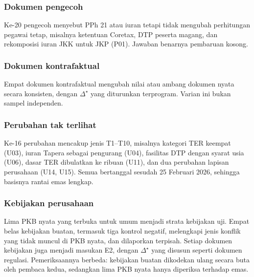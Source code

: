 \documentclass[journal,a4paper]{IEEEtran}
\newcommand{\emas}{\star}
\begin{document}
\subsubsection{Dokumen pengecoh}
Ke-20 pengecoh menyebut PPh 21 atau iuran tetapi tidak mengubah perhitungan pegawai tetap, misalnya ketentuan Coretax, DTP peserta magang, dan rekomposisi iuran JKK untuk JKP (P01). Jawaban benarnya pembaruan kosong.

\subsubsection{Dokumen kontrafaktual}
Empat dokumen kontrafaktual mengubah nilai atau ambang dokumen nyata secara konsisten, dengan $\Delta^{\emas}$ yang diturunkan terprogram. Varian ini bukan sampel independen.

\subsubsection{Perubahan tak terlihat}
Ke-16 perubahan mencakup jenis T1--T10, misalnya kategori TER keempat (U03), iuran Tapera sebagai pengurang (U04), fasilitas DTP dengan syarat usia (U06), dasar TER dibulatkan ke ribuan (U11), dan dua perubahan lapisan perusahaan (U14, U15). Semua bertanggal sesudah 25 Februari 2026, sehingga basisnya rantai emas lengkap.

\subsubsection{Kebijakan perusahaan}
Lima PKB nyata yang terbuka untuk umum menjadi strata kebijakan uji. Empat belas kebijakan buatan, termasuk tiga kontrol negatif, melengkapi jenis konflik yang tidak muncul di PKB nyata, dan dilaporkan terpisah. Setiap dokumen kebijakan juga menjadi masukan E2, dengan $\Delta^{\emas}$ yang disusun seperti dokumen regulasi. Pemeriksaannya berbeda: kebijakan buatan dikodekan ulang secara buta oleh pembaca kedua, sedangkan lima PKB nyata hanya diperiksa terhadap emas.
\end{document}
